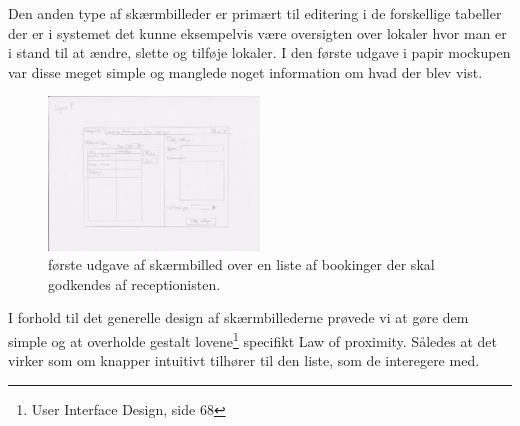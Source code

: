 Den anden type af skærmbilleder er primært til editering i de forskellige tabeller der er i systemet det kunne eksempelvis være oversigten over lokaler hvor man er i stand til at ændre, slette og tilføje lokaler.
I den første udgave i papir mockupen var disse meget simple og manglede noget information om hvad der blev vist.
\begin{figure}[h!]
  \caption{første udgave af skærmbilled over en liste af bookinger der skal godkendes af receptionisten.}
  \centering
    \includegraphics[width=0.5\textwidth]{Appendix/GUI-Prototype/PaperMockup/UdstyrsListe}
\end{figure} 
I forhold til det generelle design af skærmbillederne prøvede vi at gøre dem simple og at overholde gestalt lovene\footnote{User Interface Design, side 68} specifikt Law of proximity. Således at det virker som om knapper intuitivt tilhører til den liste, som de interegere med.




